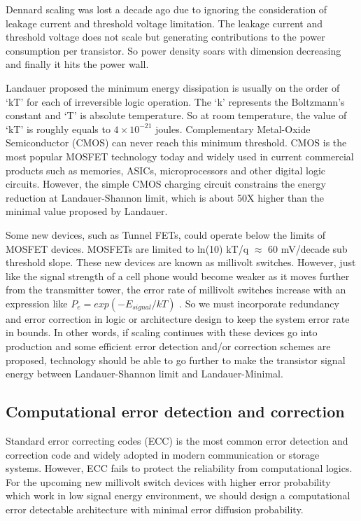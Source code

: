 \documentclass{sig-alternate}
\begin{document}
Dennard scaling was lost a decade ago due to ignoring the consideration of leakage current and threshold voltage limitation. The leakage current and threshold voltage does not scale but generating contributions to the power consumption per transistor. So power density soars with dimension decreasing and finally it hits the power wall.

Landauer\cite{Landauer_mini} proposed the minimum energy dissipation is usually on the order of `kT' for each of irreversible logic operation. The `k' represents the Boltzmann's constant and `T' is absolute temperature. So at room temperature, the value of `kT' is roughly equals to $4\times10^{-21}$ joules. Complementary Metal-Oxide Semiconductor (CMOS) can never reach this minimum threshold.  
CMOS is the most popular MOSFET technology today and widely used in current commercial products such as memories, ASICs, microprocessors and other digital logic circuits. However, the simple CMOS charging circuit constrains the energy reduction at Landauer-Shannon limit\cite{Landauer-Shannon}, which is about 50X higher than the minimal value proposed by Landauer.

Some new devices, such as Tunnel FETs\cite{TFET}, could operate below the limits of MOSFET devices. MOSFETs are limited to ln(10) kT/q $\approx$ 60 mV/decade sub threshold slope. These new devices are known as millivolt switches. However, just like the signal strength of a cell phone would become weaker as it moves further from the transmitter tower, the error rate of millivolt switches increase with an expression like $P_{e} = exp(-E_{signal} / kT)$ \cite{Agarwal}. So we must incorporate redundancy and error correction in logic or architecture design to keep the system error rate in bounds. In other words, if scaling continues with these devices go into production and some efficient error detection and/or correction schemes are proposed, technology should be able to go further to make the transistor signal energy between Landauer-Shannon limit and Landauer-Minimal. 

\subsection{Computational error detection and correction}
Standard error correcting codes (ECC)\cite{macwilliams1977theory}  is the most common error detection and correction code and widely adopted in modern communication or storage systems. However, ECC fails to protect the reliability from computational logics. For the upcoming new millivolt switch devices with higher error probability which work in low signal energy environment, we should design a computational error detectable architecture with minimal error diffusion probability.
\end{document}
